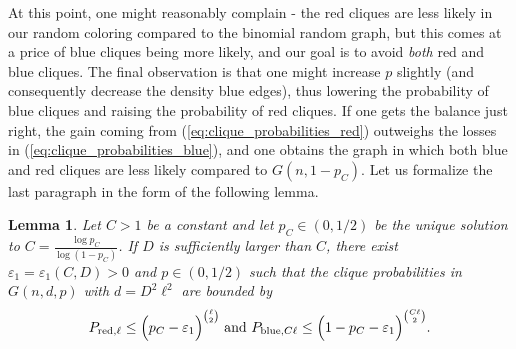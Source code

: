 \documentclass[11pt]{amsart}
\newtheorem{lemma}[theorem]{\bf Lemma}
\theoremstyle{definition}
\def\eps{\varepsilon}
\begin{document}
At this point, one might reasonably complain - the red cliques are less likely in our random coloring compared to the binomial random graph, but this comes at a price of blue cliques being more likely, and our goal is to avoid \textit{both} red and blue cliques. The final observation is that one might increase $p$ slightly (and consequently decrease the density blue edges), thus lowering the probability of blue cliques and raising the probability of red cliques. If one gets the balance just right, the gain coming from (\ref{eq:clique_probabilities_red}) outweighs the losses in (\ref{eq:clique_probabilities_blue}), and one obtains the graph in which both blue and red cliques are less likely compared to $G(n, 1-p_C)$. Let us formalize the last paragraph in the form of the following lemma.

\begin{lemma}\label{lemma:bookkeeping}
Let $C>1$ be a constant and let $p_C\in (0, 1/2)$ be the unique solution to $C=\frac{\log p_C}{\log (1-p_C)}$. If $D$ is sufficiently larger than $C$, there exist $\eps_1=\eps_1(C, D)>0$ and $p\in (0, 1/2)$ such that the clique probabilities in $G(n, d, p)$  with $d=D^2\ell^2$ are bounded by
{\smaller[0.3]
\[P_{{\rm red}, \ell}\leq \Big(p_C-\eps_1\Big)^{\binom{\ell}{2}} \text{ and } P_{{\rm blue}, C\ell}\leq \Big(1-p_C-\eps_1 \Big)^{\binom{C\ell}{2}}.\]
}
\end{lemma}
\end{document}

